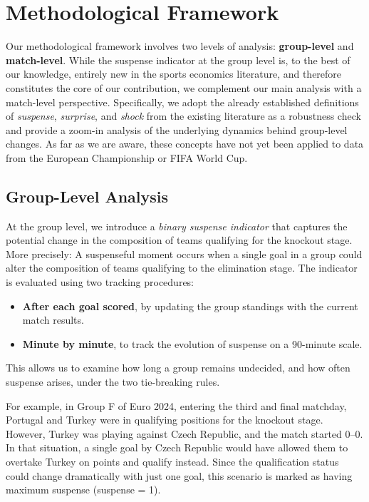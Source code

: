 \documentclass[11pt]{article}
\begin{document}
\section{Methodological Framework}
\label{sec:estimation}


Our methodological framework involves two levels of analysis: \textbf{group-level} and \textbf{match-level}. While the suspense indicator at the group level is, to the best of our knowledge, entirely new in the sports economics literature, and therefore constitutes the core of our contribution, we complement our main analysis with a match-level perspective. Specifically, we adopt the already established definitions of \textit{suspense}, \textit{surprise}, and \textit{shock} from the existing literature as a robustness check and provide a zoom-in analysis of the underlying dynamics behind group-level changes. As far as we are aware, these concepts have not yet been applied to data from the European Championship or FIFA World Cup.

\subsection*{Group-Level Analysis}

At the group level, we introduce a \textit{binary suspense indicator} that captures the potential change in the composition of teams qualifying for the knockout stage. More precisely: A suspenseful moment occurs when a single goal in a group could alter the composition of teams qualifying to the elimination stage. The indicator is evaluated using two tracking procedures: 


\begin{itemize}
    \item \textbf{After each goal scored}, by updating the group standings with the current match results.
    \item \textbf{Minute by minute}, to track the evolution of suspense on a 90-minute scale.
\end{itemize}

This allows us to examine how long a group remains undecided, and how often suspense arises, under the two tie-breaking rules.

For example, in Group F of Euro 2024, entering the third and final matchday, Portugal and Turkey were in qualifying positions for the knockout stage. However, Turkey was playing against Czech Republic, and the match started 0–0. In that situation, a single goal by Czech Republic would have allowed them to overtake Turkey on points and qualify instead. Since the qualification status could change dramatically with just one goal, this scenario is marked as having maximum suspense (suspense = 1).
\end{document}
